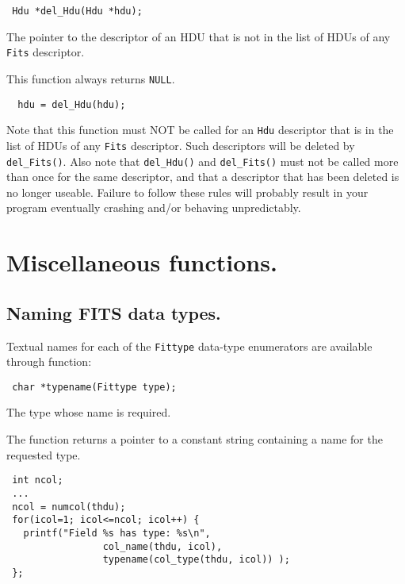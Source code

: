 \label{del_Hdu}\begin{verbatim}
 Hdu *del_Hdu(Hdu *hdu);
\end{verbatim}
\begin{arglist}
  The pointer to the descriptor of an HDU that is not in
             the list of HDUs of any \verb`Fits` descriptor.
\end{arglist}
  This function always returns \verb`NULL`.

\begin{verbatim}
  hdu = del_Hdu(hdu);
\end{verbatim}

Note that this function must NOT be called for an \verb`Hdu`
descriptor that is in the list of HDUs of any \verb`Fits` descriptor.
Such descriptors will be deleted by \verb`del_Fits()`. Also note that
\verb`del_Hdu()` and \verb`del_Fits()` must not be called more than
once for the same descriptor, and that a descriptor that has been
deleted is no longer useable. Failure to follow these rules will
probably result in your program eventually crashing and/or behaving
unpredictably.

\section{Miscellaneous functions.}

\subsection{Naming FITS data types.}

Textual names for each of the \verb`Fittype` data-type enumerators are
available through function:

\label{typename}\begin{verbatim}
 char *typename(Fittype type);
\end{verbatim}

\begin{arglist}
 The type whose name is required.
\end{arglist}

The function returns a pointer to a constant string containing a name
for the requested type.

\begin{verbatim}
 int ncol;
 ...
 ncol = numcol(thdu);
 for(icol=1; icol<=ncol; icol++) {
   printf("Field %s has type: %s\n",
                 col_name(thdu, icol),
                 typename(col_type(thdu, icol)) );
 };
\end{verbatim}

